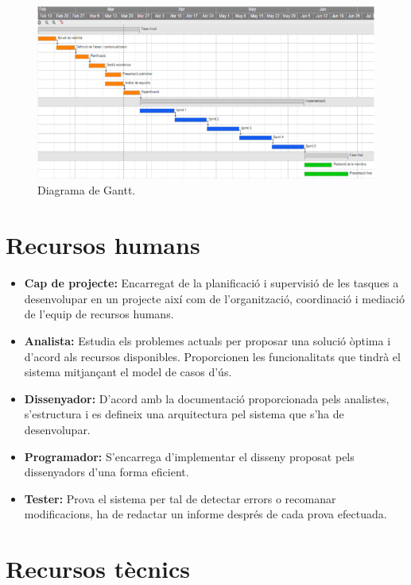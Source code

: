 \begin{figure}[!h]
\centering
\includegraphics[scale=0.65]{Figures/Gantt.jpg}
\caption{Diagrama de Gantt.}
\end{figure}

\section{Recursos humans}

\begin{itemize}

\item{}\textbf{Cap de projecte:} Encarregat de la planificació i supervisió de les tasques a desenvolupar en un projecte així com de l'organització, coordinació i mediació de l'equip de recursos humans.
\item{}\textbf{Analista:} Estudia els problemes actuals per proposar una solució òptima i d'acord als recursos disponibles. Proporcionen les funcionalitats que tindrà el sistema mitjançant el model de casos d'ús.
\item{}\textbf{Dissenyador:} D'acord amb la documentació proporcionada pels analistes, s'estructura i es defineix una arquitectura pel sistema que s'ha de desenvolupar.
\item{}\textbf{Programador:} S'encarrega d'implementar el disseny proposat pels dissenyadors d'una forma eficient.
\item{}\textbf{Tester:} Prova el sistema per tal de detectar errors o recomanar modificacions, ha de redactar un informe després de cada prova efectuada.
\end{itemize}

\clearpage

\section{Recursos tècnics}

